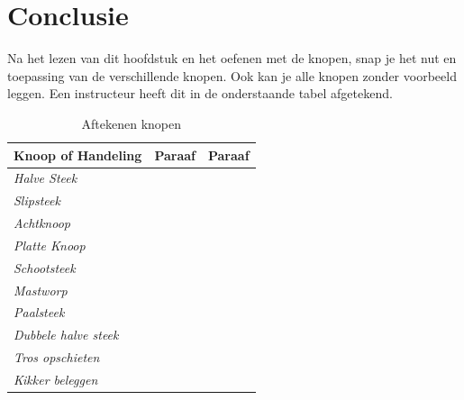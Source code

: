 \section{Conclusie}
Na het lezen van dit hoofdstuk en het oefenen met de knopen, snap je het nut en toepassing van de verschillende knopen. Ook kan je alle knopen zonder voorbeeld leggen. Een instructeur heeft dit in de onderstaande tabel afgetekend.
\vspace{2cm}
\begin{table}[H]
\centering
\caption{Aftekenen knopen}
\label{my-label}
\begin{tabular}{|l|l|l|}
\hline
\textbf{Knoop of Handeling}  & \textbf{Paraaf} & \textbf{Paraaf} \\ \hline
\textit{Halve Steek}         &                 &                 \\ \hline
\textit{Slipsteek}          &                 &                 \\ \hline
\textit{Achtknoop}           &                 &                 \\ \hline
\textit{Platte Knoop}        &                 &                 \\ \hline
\textit{Schootsteek}        &                 &                 \\ \hline
\textit{Mastworp}            &                 &                 \\ \hline
\textit{Paalsteek}           &                 &                 \\ \hline
\textit{Dubbele halve steek} &                 &                 \\ \hline
\textit{Tros opschieten}     &                 &                 \\ \hline
\textit{Kikker beleggen}     &                 &                 \\ \hline
\end{tabular}
\end{table}